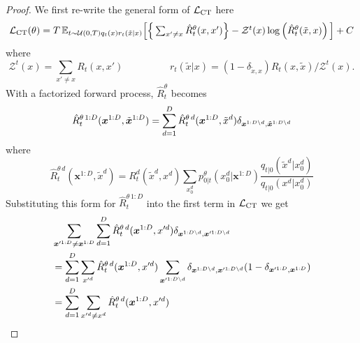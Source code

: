 \documentclass{article}
\begin{document}
\begin{proof}
We first re-write the general form of $\mathcal{L}_{\textup{CT}}$ here
\begin{equation}
   \textstyle \mathcal{L}_{\textup{CT}}(\theta) = T \, \mathbb{E}_{t\sim \mathcal{U}(0, T) q_t(x) r_t(\tilde{x}|x)} \Big[ \Big\{ \sum_{x' \neq x} \hat{R}_t^\theta(x, x') \Big\} - \mathcal{Z}^t(x) \log \left(\hat{R}_t^\theta(\tilde{x}, x) \right) \Big] + C
\end{equation}
where
\begin{equation}
    \textstyle \mathcal{Z}^t(x) = \sum_{x' \neq x} R_t(x, x') \hspace{2cm} r_t(\tilde{x}|x) = (1 - \delta_{\tilde{x}, x} ) R_t(x, \tilde{x})/\mathcal{Z}^t(x).
\end{equation}
With a factorized forward process, $\hat{R}_t^\theta$ becomes
\begin{equation}
    \hat{R}_t^{\theta \, 1:D}(\bm{x}^{1:D}, \tilde{\bm{x}}^{1:D}) = \sum_{d=1}^D \hat{R}_t^{\theta \, d}(\bm{x}^{1:D}, \tilde{x}^d) \delta_{\bm{x}^{1:D \backslash d}, \tilde{\bm{x}}^{1:D \backslash d}}
\end{equation}
where
\begin{equation}
    \hat{R}_t^{\theta \, d} (\bm{x}^{1:D}, \tilde{x}^d) = R_t^d(\tilde{x}^d, x^d) \sum_{x_0^d} p_{0|t}^\theta (x_0^d | \bm{x}^{1:D}) \frac{q_{t|0}(\tilde{x}^d | x_0^d)}{q_{t|0}(x^d | x_0^d)}
\end{equation}
Substituting this form for $\hat{R}_t^{\theta \, 1:D}$ into the first term in $\mathcal{L}_{\textup{CT}}$ we get
\begin{align}
    &\sum_{\bm{x}'^{1:D} \neq \bm{x}^{1:D}} \sum_{d=1}^D \hat{R}_t^{\theta \, d}(\bm{x}^{1:D}, x'^d) \delta_{\bm{x}^{1:D \backslash d}, \bm{x}'^{1:D \backslash d} }\\
    &= \sum_{d=1}^D \sum_{x'^d} \hat{R}_t^{\theta \, d}(\bm{x}^{1:D}, x'^d) \sum_{\bm{x}'^{1:D \backslash d}} \delta_{\bm{x}^{1:D \backslash d}, \bm{x}'^{1:D \backslash d}} ( 1 - \delta_{\bm{x}'^{1:D}, \bm{x}^{1:D}})\\
    &= \sum_{d=1}^D \sum_{x'^d \neq x^d} \hat{R}_t^{\theta \, d}(\bm{x}^{1:D}, x'^d)
\end{align}




\end{proof}
\end{document}
